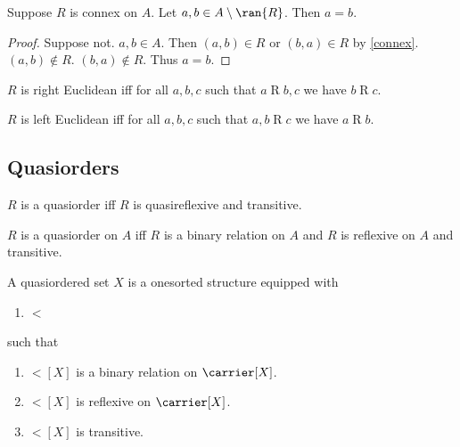 \begin{proposition}\label{connex_reaches_all_or_all_but_one}
    Suppose $R$ is connex on $A$.
    Let $a, b\in A\setminus\ran{R}$.
    Then $a = b$.
\end{proposition}
\begin{proof}
    Suppose not.
    $a, b\in A$.
    Then $(a, b)\in R$ or $(b,a)\in R$ by \cref{connex}.
    $(a, b)\notin R$.
    $(b, a)\notin R$.
    Thus $a = b$.
\end{proof}


\begin{definition}\label{righteuclidean}
    $R$ is right Euclidean iff
    for all $a,b,c$ such that $a\mathrel{R}b,c$ we have $b\mathrel{R}c$.
\end{definition}

\begin{definition}\label{lefteuclidean}
    $R$ is left Euclidean iff
    for all $a,b,c$ such that $a,b\mathrel{R}c$ we have $a\mathrel{R}b$.
\end{definition}
\subsection{Quasiorders}

\begin{abbreviation}\label{quasiorder}
    $R$ is a quasiorder iff
    $R$ is quasireflexive and transitive.
\end{abbreviation}

\begin{abbreviation}\label{quasiorder_on}
    $R$ is a quasiorder on $A$ iff
        $R$ is a binary relation on $A$ and
        $R$ is reflexive on $A$ and transitive.
\end{abbreviation}

\begin{struct}\label{quasiordered_set}
    A quasiordered set $X$ is a onesorted structure
    equipped with
        \begin{enumerate}
            \item $\lt$
        \end{enumerate}
    such that
    \begin{enumerate}
        \item\label{quasiorder_type} $\lt[X]$ is a binary relation on $\carrier[X]$.
        \item\label{quasiorder_refl} $\lt[X]$ is reflexive on $\carrier[X]$.
        \item\label{quasiorder_tran} $\lt[X]$ is transitive.
    \end{enumerate}
\end{struct}

